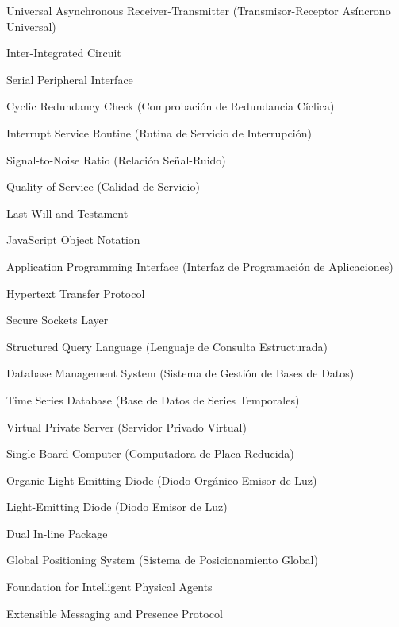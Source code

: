 {Universal Asynchronous Receiver-Transmitter (Transmisor-Receptor Asíncrono Universal)}

{Inter-Integrated Circuit}

{Serial Peripheral Interface}

{Cyclic Redundancy Check (Comprobación de Redundancia Cíclica)}

{Interrupt Service Routine (Rutina de Servicio de Interrupción)}

{Signal-to-Noise Ratio (Relación Señal-Ruido)}

{Quality of Service (Calidad de Servicio)}

{Last Will and Testament}

{JavaScript Object Notation}

{Application Programming Interface (Interfaz de Programación de Aplicaciones)}

{Hypertext Transfer Protocol}

{Secure Sockets Layer}

{Structured Query Language (Lenguaje de Consulta Estructurada)}

{Database Management System (Sistema de Gestión de Bases de Datos)}

{Time Series Database (Base de Datos de Series Temporales)}

{Virtual Private Server (Servidor Privado Virtual)}

{Single Board Computer (Computadora de Placa Reducida)}

{Organic Light-Emitting Diode (Diodo Orgánico Emisor de Luz)}

{Light-Emitting Diode (Diodo Emisor de Luz)}

{Dual In-line Package}

{Global Positioning System (Sistema de Posicionamiento Global)}

{Foundation for Intelligent Physical Agents}

{Extensible Messaging and Presence Protocol}

